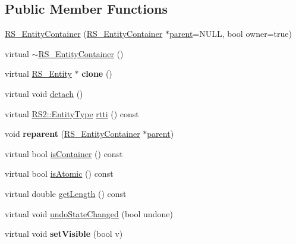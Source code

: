 \subsection*{Public Member Functions}
\begin{DoxyCompactItemize}
\item 
\hyperlink{classRS__EntityContainer_aacf401786f2ee12612df0f4505b68ae6}{R\-S\-\_\-\-Entity\-Container} (\hyperlink{classRS__EntityContainer}{R\-S\-\_\-\-Entity\-Container} $\ast$\hyperlink{classRS__Entity_a80358a8d2fc6739a516a278dc500b49f}{parent}=N\-U\-L\-L, bool owner=true)
\item 
virtual \hyperlink{classRS__EntityContainer_ac30a549709d15014fa092e139d7df457}{$\sim$\-R\-S\-\_\-\-Entity\-Container} ()
\item 
\hypertarget{classRS__EntityContainer_a4ed055caf0956f03195d778ec0d0e35f}{virtual \hyperlink{classRS__Entity}{R\-S\-\_\-\-Entity} $\ast$ {\bfseries clone} ()}\label{classRS__EntityContainer_a4ed055caf0956f03195d778ec0d0e35f}

\item 
virtual void \hyperlink{classRS__EntityContainer_a7d356e0e2ab2d80f4cd7fd7f07eee506}{detach} ()
\item 
virtual \hyperlink{classRS2_a8f26d1b981e1e85cff16738b43337e6a}{R\-S2\-::\-Entity\-Type} \hyperlink{classRS__EntityContainer_ada84ceb9590c74cd3b46134cdde40a3d}{rtti} () const 
\item 
\hypertarget{classRS__EntityContainer_a201efb0a061b5cf05a9c244c933bc98c}{void {\bfseries reparent} (\hyperlink{classRS__EntityContainer}{R\-S\-\_\-\-Entity\-Container} $\ast$\hyperlink{classRS__Entity_a80358a8d2fc6739a516a278dc500b49f}{parent})}\label{classRS__EntityContainer_a201efb0a061b5cf05a9c244c933bc98c}

\item 
virtual bool \hyperlink{classRS__EntityContainer_a74ff8b794220eb00317ca75f4f78b58a}{is\-Container} () const 
\item 
virtual bool \hyperlink{classRS__EntityContainer_ac8b53b69afb75176b407add459c9deef}{is\-Atomic} () const 
\item 
virtual double \hyperlink{classRS__EntityContainer_a6338d8e7a5a14bca8731ddd86c1da77b}{get\-Length} () const 
\item 
virtual void \hyperlink{classRS__EntityContainer_a2744a674667c0c9d4c1779c573616685}{undo\-State\-Changed} (bool undone)
\item 
\hypertarget{classRS__EntityContainer_a88bcc93f2a4fd07a4717c8ded89eef1b}{virtual void {\bfseries set\-Visible} (bool v)}\label{classRS__EntityContainer_a88bcc93f2a4fd07a4717c8ded89eef1b}


\end{DoxyCompactItemize}
